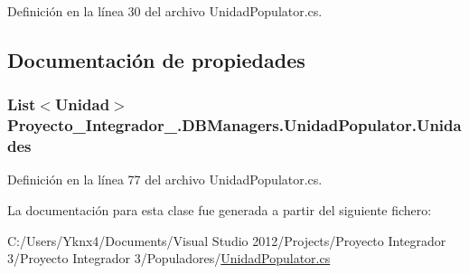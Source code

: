 Definición en la línea 30 del archivo Unidad\-Populator.\-cs.



\subsection{Documentación de propiedades}
\hypertarget{class_proyecto___integrador__3_1_1_d_b_managers_1_1_unidad_populator_afe040b3a09b399c74d58c04acbb0d30a}{
\subsubsection[{Unidades}]{\setlength{\rightskip}{0pt plus 5cm}List$<${\bf Unidad}$>$ Proyecto\-\_\-\-Integrador\-\_.\-D\-B\-Managers.\-Unidad\-Populator.\-Unidades\hspace{0.3cm}{\ttfamily [get]}}}\label{class_proyecto___integrador__3_1_1_d_b_managers_1_1_unidad_populator_afe040b3a09b399c74d58c04acbb0d30a}


Definición en la línea 77 del archivo Unidad\-Populator.\-cs.



La documentación para esta clase fue generada a partir del siguiente fichero\-:\begin{DoxyCompactItemize}
\item 
C\-:/\-Users/\-Yknx4/\-Documents/\-Visual Studio 2012/\-Projects/\-Proyecto Integrador 3/\-Proyecto Integrador 3/\-Populadores/\hyperlink{_unidad_populator_8cs}{Unidad\-Populator.\-cs}\end{DoxyCompactItemize}
